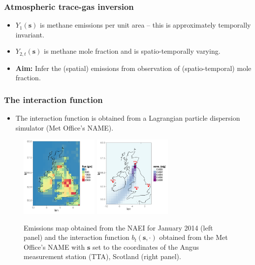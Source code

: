 \documentclass{beamer}
\newcommand{\svec} {\textbf{s}}
\newcommand{\uvec} {\textbf{u}}
\newcommand{\s}{\mathbf{s}}
\begin{document}
\begin{frame}
\frametitle{Atmospheric trace-gas inversion}

\begin{itemize}
\item $Y_1(\svec)$ is methane emissions per unit area -- this is approximately temporally invariant. \vfill
\item $Y_{2,t}(\svec)$ is methane mole fraction and is spatio-temporally varying. \vfill
\item {\bf Aim:} Infer the (spatial) emissions from observation of (spatio-temporal) mole fraction.\vfill
\end{itemize}
\end{frame}

\begin{frame}
\frametitle{The interaction function}

\begin{itemize}
\item The interaction function is obtained from a Lagrangian particle dispersion simulator (Met Office's NAME).
\end{itemize}

\begin{center}
\begin{figure}
\includegraphics[width=1.5in]{NAEI.png}  
\includegraphics[width=1.5in]{TAC_01_01.png}
\caption{Emissions map obtained from the NAEI for January 2014 (left panel) and the interaction function $b_t(\s,\cdot)$ obtained from the Met Office's NAME  with $\s$ set to the coordinates of the Angus measurement station (\textsc{TTA}), Scotland (right panel).}
\end{figure}
\end{center}
\end{frame}
\end{document}
